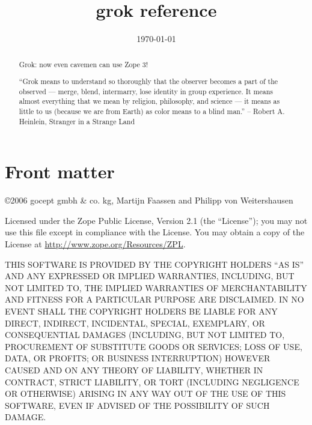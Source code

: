 \documentclass{manual}
\title{grok reference}
\date{\today}   %
\begin{document}
\maketitle

\ifhtml
\chapter*{Front matter\label{front}}
\fi

\copyright 2006 gocept gmbh \& co. kg, Martijn Faassen and Philipp von
Weitershausen

Licensed under the Zope Public License, Version 2.1 (the ``License''); you may
not use this file except in compliance with the License. You may obtain a copy
of the License at \url{http://www.zope.org/Resources/ZPL}.

THIS SOFTWARE IS PROVIDED BY THE COPYRIGHT HOLDERS ``AS IS'' AND ANY EXPRESSED
OR IMPLIED WARRANTIES, INCLUDING, BUT NOT LIMITED TO, THE IMPLIED WARRANTIES OF
MERCHANTABILITY AND FITNESS FOR A PARTICULAR PURPOSE ARE DISCLAIMED. IN NO
EVENT SHALL THE COPYRIGHT HOLDERS BE LIABLE FOR ANY DIRECT, INDIRECT,
INCIDENTAL, SPECIAL, EXEMPLARY, OR CONSEQUENTIAL DAMAGES (INCLUDING, BUT NOT
LIMITED TO, PROCUREMENT OF SUBSTITUTE GOODS OR SERVICES; LOSS OF USE, DATA, OR
PROFITS; OR BUSINESS INTERRUPTION) HOWEVER CAUSED AND ON ANY THEORY OF
LIABILITY, WHETHER IN CONTRACT, STRICT LIABILITY, OR TORT (INCLUDING NEGLIGENCE
OR OTHERWISE) ARISING IN ANY WAY OUT OF THE USE OF THIS SOFTWARE, EVEN IF
ADVISED OF THE POSSIBILITY OF SUCH DAMAGE.

\begin{abstract}

\noindent

Grok: now even cavemen can use Zope 3!

\begin{notice}
``Grok means to understand so thoroughly that the observer becomes a part of the
observed --- merge, blend, intermarry, lose identity in group experience.
It means almost everything that we mean by religion, philosophy, and
science --- it means as little to us (because we are from Earth) as color
means to a blind man.'' -- Robert A. Heinlein, Stranger in a Strange Land
\end{notice}

\end{abstract}

\tableofcontents



%

%

%
\end{document}
